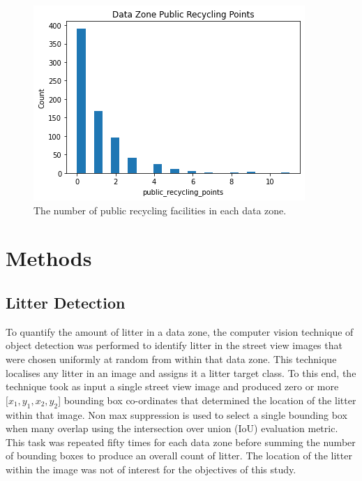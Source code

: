 \documentclass{thesis}
\begin{document}
\begin{figure}[h!]
    \centering
    \includegraphics[scale=0.6]{images/data-zone-public-recycling-points.png}
    \caption{The number of public recycling facilities in each data zone.}
    \label{fig:public-recycling-points-analysis}
\end{figure}




\chapter{Methods} \label{chapter:methods}

\section{Litter Detection}

To quantify the amount of litter in a data zone, the computer vision technique of object detection was performed to identify litter in the street view images that were chosen uniformly at random from within that data zone. This technique localises any litter in an image and assigns it a litter target class. To this end, the technique took as input a single street view image and produced zero or more $[x_1,y_1,x_2,y_2$] bounding box co-ordinates that determined the location of the litter within that image. Non max suppression is used to select a single bounding box when many overlap using the intersection over union (IoU) evaluation metric. This task was repeated fifty times for each data zone before summing the number of bounding boxes to produce an overall count of litter. The location of the litter within the image was not of interest for the objectives of this study.
\end{document}
